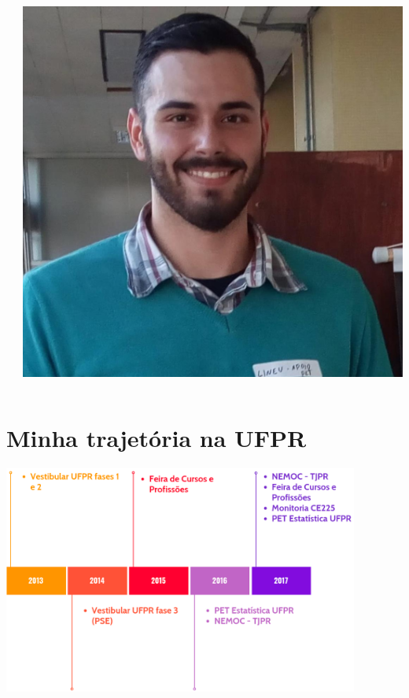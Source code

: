 \documentclass[10pt,
  aspectratio=169,
  serif,
  mathserif,
  professionalfont,
  compress,
  handout,
  ]{beamer}\usepackage[]{graphicx}\usepackage[]{color}
\begin{document}
\begin{frame}
\begin{columns}
\begin{column}{0.7\textwidth}
\end{column}
\begin{column}{0.3\textwidth}  %
    \begin{center}
     \includegraphics[width=\textwidth]{img/eu3.jpeg}
     \end{center}
\end{column}
\end{columns}
\end{frame}


\section{Minha trajetória na UFPR}

\begin{frame}

\begin{center}
  \includegraphics[width=11.7cm]{img/timeline11.png}
\end{center}

\end{frame}
\end{document}
